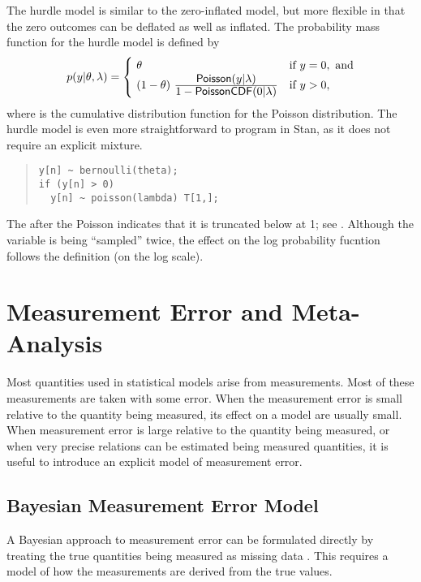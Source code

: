 The hurdle model is similar to the zero-inflated model, but more
flexible in that the zero outcomes can be deflated as well as
inflated.  The probability mass function for the hurdle model is
defined by 
%
\[
p(y|\theta,\lambda)
= 
\begin{cases}
\ \theta & \mbox{if } y = 0, \mbox{ and}
\\
\ (1 - \theta)
  \
   \frac{\displaystyle \distro{Poisson}(y | \lambda)}
        {\displaystyle \vspace*{8pt} 1 - \distro{PoissonCDF}(0 | \lambda)}
& \mbox{if } y > 0,
\end{cases}
\]
%
where  is the cumulative distribution function for
the Poisson distribution.  The hurdle model is even more straightforward to
program in Stan, as it does not require an explicit mixture.  
%
\begin{quote}
\begin{Verbatim}
y[n] ~ bernoulli(theta);
if (y[n] > 0)
  y[n] ~ poisson(lambda) T[1,];
\end{Verbatim}
\end{quote}
%
The \code{[1,]} after the Poisson indicates that it is truncated below
at 1; see \refsection{poisson}.  Although the variable 
 is being ``sampled'' twice, the effect on the log
probability fucntion follows the definition (on the log scale).  


\chapter{Measurement Error and Meta-Analysis}

\noindent
Most quantities used in statistical models arise from measurements.
Most of these measurements are taken with some error.  When the
measurement error is small relative to the quantity being measured,
its effect on a model are usually small.  When measurement error is
large relative to the quantity being measured, or when very precise
relations can be estimated being measured quantities, it is useful to
introduce an explicit model of measurement error.


\section{Bayesian Measurement Error Model}

A Bayesian approach to measurement error can be formulated directly by
treating the true quantities being measured as missing data
\citep{Clayton:1992, RichardsonGilks:1993}.  This requires a model of
how the measurements are derived from the true values.

